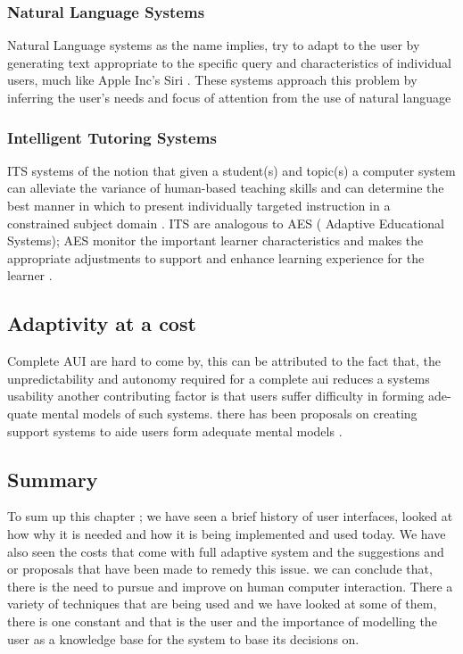 \subsubsection{Natural Language Systems}
Natural Language systems as the name implies, try to adapt to the user by generating text appropriate to the specific query and characteristics of individual users, much like Apple Inc's Siri \cite{website:SIRI}. These systems approach this problem by inferring the user's needs and focus of attention from the use of natural language \cite{benyon1993adaptive}
\subsubsection{Intelligent Tutoring Systems}
ITS systems of the notion that given a student(s) and topic(s) a computer system can alleviate the variance of human-based teaching skills and can determine the best manner in which to present individually targeted instruction in a constrained subject domain \cite{benyon1993adaptive}. ITS are analogous to AES ( Adaptive Educational Systems); AES monitor the important learner characteristics and makes the appropriate adjustments to support and enhance learning experience for the learner \cite{shute2012adaptive}.
\subsection{Adaptivity at a cost}
Complete AUI are hard to come by, this can be attributed to the fact that, the unpredictability and autonomy required for a complete aui reduces a systems usability 
another contributing factor is that users suffer difficulty in forming ade- quate mental models of such systems. there has been proposals on creating support systems to aide users form adequate mental models \cite{paymans2004usability}.
\subsection{Summary}
To sum up this chapter ; we have seen a brief history of user interfaces, looked at how why it is needed and how it is being implemented and used today. We have also seen the costs that come with full adaptive system and the suggestions and or proposals that have been made to remedy this issue. we can conclude that, there is the need to pursue and improve on human computer interaction. There a variety of techniques that are being used and we have looked at some of them, there is one constant and that is the user and the importance of modelling the user as a knowledge base for the system to base its decisions on.
